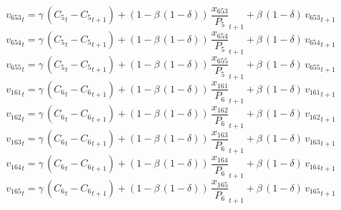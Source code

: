 \begin{dmath}
{{v_{653}}}_{t}={{\gamma}}\, \left({{C_{5}}}_{t}-{{C_{5}}}_{t+1}\right)+\left(1-{{\beta}}\, \left(1-{{\delta}}\right)\right)\, {{\frac{x_{653}}{P_{5}}}}_{t+1}+{{\beta}}\, \left(1-{{\delta}}\right)\, {{v_{653}}}_{t+1}
\end{dmath}
\begin{dmath}
{{v_{654}}}_{t}={{\gamma}}\, \left({{C_{5}}}_{t}-{{C_{5}}}_{t+1}\right)+\left(1-{{\beta}}\, \left(1-{{\delta}}\right)\right)\, {{\frac{x_{654}}{P_{5}}}}_{t+1}+{{\beta}}\, \left(1-{{\delta}}\right)\, {{v_{654}}}_{t+1}
\end{dmath}
\begin{dmath}
{{v_{655}}}_{t}={{\gamma}}\, \left({{C_{5}}}_{t}-{{C_{5}}}_{t+1}\right)+\left(1-{{\beta}}\, \left(1-{{\delta}}\right)\right)\, {{\frac{x_{655}}{P_{5}}}}_{t+1}+{{\beta}}\, \left(1-{{\delta}}\right)\, {{v_{655}}}_{t+1}
\end{dmath}
\begin{dmath}
{{v_{161}}}_{t}={{\gamma}}\, \left({{C_{6}}}_{t}-{{C_{6}}}_{t+1}\right)+\left(1-{{\beta}}\, \left(1-{{\delta}}\right)\right)\, {{\frac{x_{161}}{P_{6}}}}_{t+1}+{{\beta}}\, \left(1-{{\delta}}\right)\, {{v_{161}}}_{t+1}
\end{dmath}
\begin{dmath}
{{v_{162}}}_{t}={{\gamma}}\, \left({{C_{6}}}_{t}-{{C_{6}}}_{t+1}\right)+\left(1-{{\beta}}\, \left(1-{{\delta}}\right)\right)\, {{\frac{x_{162}}{P_{6}}}}_{t+1}+{{\beta}}\, \left(1-{{\delta}}\right)\, {{v_{162}}}_{t+1}
\end{dmath}
\begin{dmath}
{{v_{163}}}_{t}={{\gamma}}\, \left({{C_{6}}}_{t}-{{C_{6}}}_{t+1}\right)+\left(1-{{\beta}}\, \left(1-{{\delta}}\right)\right)\, {{\frac{x_{163}}{P_{6}}}}_{t+1}+{{\beta}}\, \left(1-{{\delta}}\right)\, {{v_{163}}}_{t+1}
\end{dmath}
\begin{dmath}
{{v_{164}}}_{t}={{\gamma}}\, \left({{C_{6}}}_{t}-{{C_{6}}}_{t+1}\right)+\left(1-{{\beta}}\, \left(1-{{\delta}}\right)\right)\, {{\frac{x_{164}}{P_{6}}}}_{t+1}+{{\beta}}\, \left(1-{{\delta}}\right)\, {{v_{164}}}_{t+1}
\end{dmath}
\begin{dmath}
{{v_{165}}}_{t}={{\gamma}}\, \left({{C_{6}}}_{t}-{{C_{6}}}_{t+1}\right)+\left(1-{{\beta}}\, \left(1-{{\delta}}\right)\right)\, {{\frac{x_{165}}{P_{6}}}}_{t+1}+{{\beta}}\, \left(1-{{\delta}}\right)\, {{v_{165}}}_{t+1}
\end{dmath}
